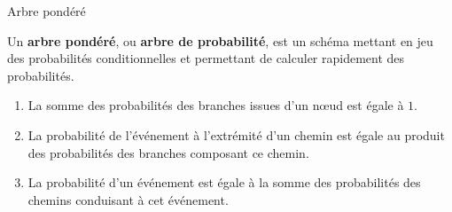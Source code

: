 \documentclass[11pt]{article}
\begin{document}
\begin{defi}{Arbre pondéré}
  \begin{minipage}{.4\textwidth}
  Un \textbf{arbre pondéré}, ou \textbf{arbre de probabilité}, est un schéma
  mettant en jeu des probabilités conditionnelles et permettant de calculer
  rapidement des probabilités.
\end{minipage}
  \begin{minipage}{.6\textwidth}
    \begin{center}
\end{center}    
  \end{minipage}
\end{defi}
\begin{propadm}
  \begin{enumerate}
    \item La somme des probabilités des branches issues d'un nœud est égale à
      $1$.
    \item La probabilité de l'événement à l'extrémité d'un chemin est égale au
      produit des probabilités des branches composant ce chemin.
    \item La probabilité d'un événement est égale à la somme des probabilités
      des chemins conduisant à cet événement.
  \end{enumerate}
\end{propadm}
\end{document}
